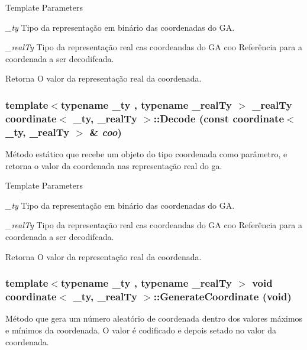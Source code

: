 \begin{DoxyTemplParams}{Template Parameters}
\item[{\em \_\-ty}]Tipo da representação em binário das coordenadas do GA. \item[{\em \_\-realTy}]Tipo da representação real cas coordeandas do GA  coo Referência para a coordenada a ser decodifcada.\end{DoxyTemplParams}
\begin{DoxyReturn}{Retorna}
O valor da representação real da coordenada. 
\end{DoxyReturn}
\hypertarget{classcoordinate_a18260f8c8efb3e0b9e5cf8181569aa98}{
\subsubsection[{Decode}]{\setlength{\rightskip}{0pt plus 5cm}template$<$typename \_\-ty , typename \_\-realTy $>$ \_\-realTy {\bf coordinate}$<$ \_\-ty, \_\-realTy $>$::Decode (const {\bf coordinate}$<$ \_\-ty, \_\-realTy $>$ \& {\em coo})}}
\label{classcoordinate_a18260f8c8efb3e0b9e5cf8181569aa98}
Método estático que recebe um objeto do tipo coordenada como parâmetro, e retorna o valor da coordenada nas representação real do ga.


\begin{DoxyTemplParams}{Template Parameters}
\item[{\em \_\-ty}]Tipo da representação em binário das coordenadas do GA. \item[{\em \_\-realTy}]Tipo da representação real cas coordeandas do GA  coo Referência para a coordenada a ser decodifcada.\end{DoxyTemplParams}
\begin{DoxyReturn}{Retorna}
O valor da representação real da coordenada. 
\end{DoxyReturn}
\hypertarget{classcoordinate_a6ee17f2dd5b36b7bc2fc7b404afb899c}{
\subsubsection[{GenerateCoordinate}]{\setlength{\rightskip}{0pt plus 5cm}template$<$typename \_\-ty , typename \_\-realTy $>$ void {\bf coordinate}$<$ \_\-ty, \_\-realTy $>$::GenerateCoordinate (void)}}
\label{classcoordinate_a6ee17f2dd5b36b7bc2fc7b404afb899c}
Método que gera um número aleatório de coordenada dentro dos valores máximos e mínimos da coordenada. O valor é codificado e depois setado no valor da coordenada.


